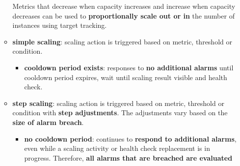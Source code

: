 \begin{itemize}
\begin{itemize}
		Metrics that decrease when capacity increases and increase when capacity decreases can be used to \textbf{proportionally scale out or in} the number of instances using target tracking.
		\item \textbf{simple scaling}: scaling action is triggered based on metric, threshold or condition. 
		\begin{itemize}
			\item \textbf{cooldown period exists}: responses to \textbf{no additional alarms} until cooldown period expires, wait until scaling result visible and health check.  
		\end{itemize}
		\item \textbf{step scaling}: scaling action is triggered based on metric, threshold or condition with \textbf{step adjustments}.  The adjustments vary based on the \textbf{size of alarm breach}.
		\begin{itemize}
			\item \textbf{no cooldown period}: continues to \textbf{respond to additional alarms}, even while a scaling activity or health check replacement is in progress. Therefore, \textbf{all alarms that are breached are evaluated}
		\end{itemize}	
		
	\end{itemize}
\end{itemize}



